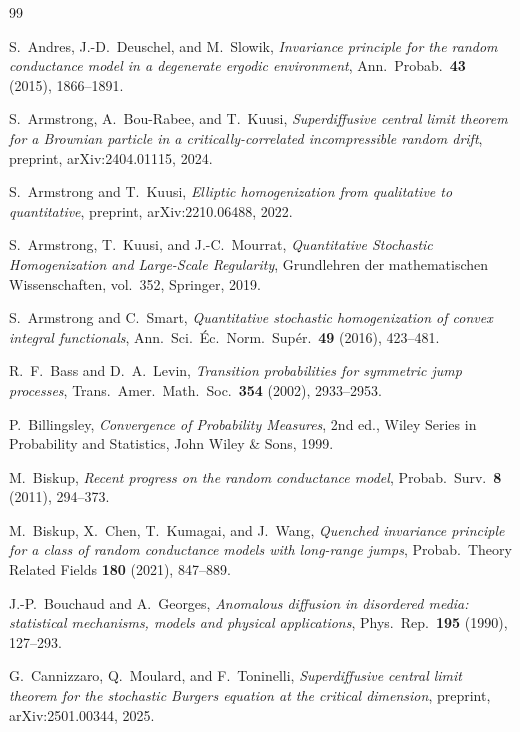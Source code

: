 \documentclass[11pt]{amsart}
\theoremstyle{plain}
\theoremstyle{definition}
\theoremstyle{remark}
\begin{document}
	\begin{thebibliography}{99}
		
		S.~Andres, J.-D.~Deuschel, and M.~Slowik,
		\emph{Invariance principle for the random conductance model in a degenerate ergodic environment},
		Ann.\ Probab.\ \textbf{43} (2015), 1866--1891.
		
		S.~Armstrong, A.~Bou-Rabee, and T.~Kuusi,
		\emph{Superdiffusive central limit theorem for a Brownian particle in a critically-correlated incompressible random drift},
		preprint, arXiv:2404.01115, 2024.
		
		S.~Armstrong and T.~Kuusi,
		\emph{Elliptic homogenization from qualitative to quantitative},
		preprint, arXiv:2210.06488, 2022.
		
		S.~Armstrong, T.~Kuusi, and J.-C.~Mourrat,
		\emph{Quantitative Stochastic Homogenization and Large-Scale Regularity},
		Grundlehren der mathematischen Wissenschaften, vol.~352, Springer, 2019.
		
		S.~Armstrong and C.~Smart,
		\emph{Quantitative stochastic homogenization of convex integral functionals},
		Ann.\ Sci.\ \'Ec.\ Norm.\ Sup\'er.\ \textbf{49} (2016), 423--481.
		
		R.~F.~Bass and D.~A.~Levin,
		\emph{Transition probabilities for symmetric jump processes},
		Trans.\ Amer.\ Math.\ Soc.\ \textbf{354} (2002), 2933--2953.
		
		P.~Billingsley,
		\emph{Convergence of Probability Measures},
		2nd ed., Wiley Series in Probability and Statistics, John Wiley \& Sons, 1999.
		
		M.~Biskup,
		\emph{Recent progress on the random conductance model},
		Probab.\ Surv.\ \textbf{8} (2011), 294--373.
		
		M.~Biskup, X.~Chen, T.~Kumagai, and J.~Wang,
		\emph{Quenched invariance principle for a class of random conductance models with long-range jumps},
		Probab.\ Theory Related Fields \textbf{180} (2021), 847--889.
		
		J.-P.~Bouchaud and A.~Georges,
		\emph{Anomalous diffusion in disordered media: statistical mechanisms, models and physical applications},
		Phys.\ Rep.\ \textbf{195} (1990), 127--293.
		
		G.~Cannizzaro, Q.~Moulard, and F.~Toninelli,
		\emph{Superdiffusive central limit theorem for the stochastic Burgers equation at the critical dimension},
		preprint, arXiv:2501.00344, 2025.
		

\end{thebibliography}
\end{document}

